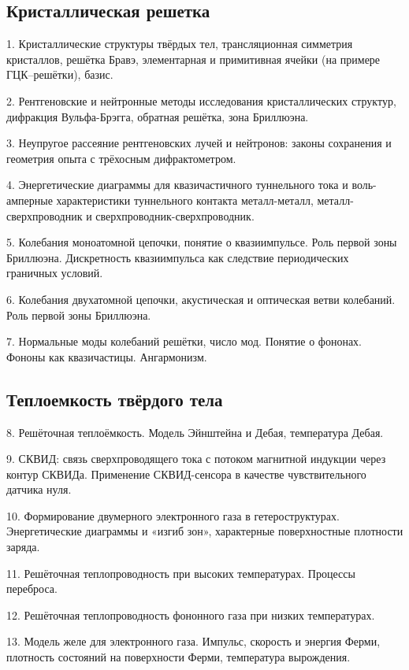 
\subsection*{Кристаллическая решетка}
1. Кристаллические структуры твёрдых тел, трансляционная симметрия кристаллов, решётка Бравэ, элементарная и примитивная ячейки (на примере ГЦК--решётки), базис.

2. Рентгеновские и нейтронные методы исследования кристаллических структур, дифракция Вульфа-Брэгга, обратная решётка, зона Бриллюэна.

3. Неупругое рассеяние рентгеновских лучей и нейтронов: законы сохранения и геометрия опыта с трёхосным дифрактометром.

4. Энергетические диаграммы для квазичастичного туннельного тока и воль-амперные характеристики туннельного контакта металл-металл, металл-сверхпроводник и сверхпроводник-сверхпроводник.

5. Колебания моноатомной цепочки, понятие о квазиимпульсе. Роль первой зоны Бриллюэна. Дискретность квазиимпульса как следствие периодических граничных условий.

6. Колебания двухатомной цепочки, акустическая и оптическая ветви колебаний. Роль первой зоны Бриллюэна.

7. Нормальные моды колебаний решётки, число мод. Понятие о фононах. Фононы как квазичастицы. Ангармонизм.





\subsection*{Теплоемкость твёрдого тела} 

8. Решёточная теплоёмкость. Модель Эйнштейна и Дебая, температура Дебая.

9. СКВИД: связь сверхпроводящего тока с потоком магнитной индукции через контур СКВИДа. Применение СКВИД-сенсора в качестве чувствительного датчика нуля.

10. Формирование двумерного электронного газа в гетероструктурах. Энергетические диаграммы и «изгиб зон», характерные поверхностные плотности заряда.

11. Решёточная теплопроводность при высоких температурах. Процессы переброса.

12. Решёточная теплопроводность фононного газа при низких температурах.

13. Модель желе для электронного газа. Импульс, скорость и энергия Ферми, плотность состояний на поверхности Ферми, температура вырождения.

